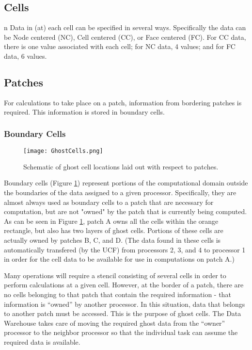 \documentclass[11pt,fleqn]{book} %
\begin{document}
\subsection{Cells}
n
Data in (at) each cell can be specified in several ways. Specifically the data can be Node centered (NC), Cell centered (CC), or Face centered (FC). For CC data, there is one value associated with each cell; for NC data, 4 values; and for FC data, 6 values. 

\subsection{Patches}

For calculations to take place on a patch, information from bordering patches is required. This information is stored in boundary cells. 

\subsubsection{Boundary Cells}

\begin{figure}
  \texttt{[image: GhostCells.png]}
  \caption{Schematic of ghost cell locations laid out with respect to patches.}
  \label{Fig:GhostCells}
\end{figure}

Boundary cells (Figure \ref{Fig:GhostCells}) represent portions of the computational domain outside the boundaries of the data assigned to a given processor. Specifically, they are almost always used as boundary cells to a patch that are necessary for computation, but are not "owned" by the patch that is currently being computed. As can be seen in Figure \ref{Fig:GhostCells}, patch A owns all the cells within the orange rectangle, but also has two layers of ghost cells. Portions of these cells are actually owned by patches B, C, and D. (The data found in these cells is automatically transfered (by the UCF) from processors 2, 3, and 4 to processor 1 in order for the cell data to be available for use in computations on patch A.)

Many operations will require a stencil consisting of several cells in order to perform calculations at a given cell. However, at the border of a patch, there are no cells belonging to that patch that contain the required information - that information is ``owned'' by another processor.  In this situation, data that belongs to another patch must be accessed. This is the purpose of ghost cells. The Data Warehouse takes care of moving the required ghost data from the ``owner'' processor to the neighbor processor so that the individual task can assume the required data is available. 
\end{document}

